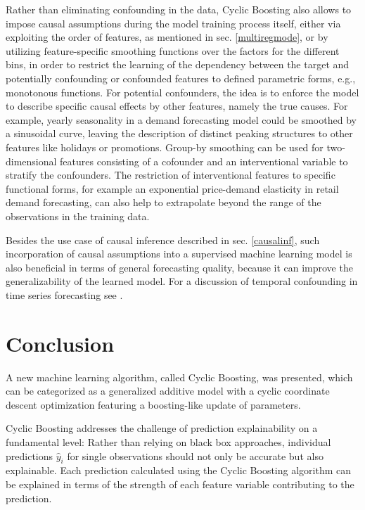 \documentclass[BCOR=1mm, DIV=calc,10pt,
twoside=true,
twocolumn,
headings=normal]{scrartcl}
\begin{document}
Rather than eliminating confounding in the data, Cyclic Boosting also allows to impose causal assumptions during the model training process itself, either via exploiting the order of features, as mentioned in sec. \ref{multiregmode}, or by utilizing feature-specific smoothing functions over the factors for the different bins, in order to restrict the learning of the dependency between the target and potentially confounding or confounded features to defined parametric forms, e.g., monotonous functions. For potential confounders, the idea is to enforce the model to describe specific causal effects by other features, namely the true causes. For example, yearly seasonality in a demand forecasting model could be smoothed by a sinusoidal curve, leaving the description of distinct peaking structures to other features like holidays or promotions. Group-by smoothing can be used for two-dimensional features consisting of a cofounder and an interventional variable to stratify the confounders. The restriction of interventional features to specific functional forms, for example an exponential price-demand elasticity in retail demand forecasting, can also help to extrapolate beyond the range of the observations in the training data.

Besides the use case of causal inference described in sec. \ref{causalinf}, such incorporation of causal assumptions into a supervised machine learning model is also beneficial in terms of general forecasting quality, because it can improve the generalizability of the learned model. For a discussion of temporal confounding in time series forecasting see \cite{wick2021demand}.


\section{Conclusion}

A new machine learning algorithm, called Cyclic Boosting, was presented, which can be
categorized as a generalized additive model with a cyclic coordinate descent optimization
featuring a boosting-like update of parameters.

Cyclic Boosting addresses the challenge of prediction explainability on a fundamental
level: Rather than relying on black box approaches, individual predictions $\hat{y}_i$
for single observations should not only be accurate but also explainable. Each prediction
calculated using the Cyclic Boosting algorithm can be explained in terms of the strength
of each feature variable contributing to the prediction.
\end{document}
